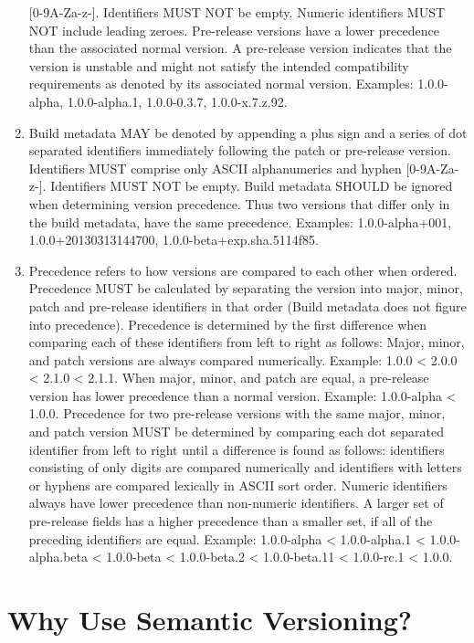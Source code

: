 \documentclass[a4paper,12pt,notitlepage,twoside,openright]{article}
\begin{document}
\begin{enumerate}
  {[}0-9A-Za-z-{]}. Identifiers MUST NOT be empty. Numeric identifiers
  MUST NOT include leading zeroes. Pre-release versions have a lower
  precedence than the associated normal version. A pre-release version
  indicates that the version is unstable and might not satisfy the
  intended compatibility requirements as denoted by its associated
  normal version. Examples: 1.0.0-alpha, 1.0.0-alpha.1, 1.0.0-0.3.7,
  1.0.0-x.7.z.92.
\item
  Build metadata MAY be denoted by appending a plus sign and a series of
  dot separated identifiers immediately following the patch or
  pre-release version. Identifiers MUST comprise only ASCII
  alphanumerics and hyphen {[}0-9A-Za-z-{]}. Identifiers MUST NOT be
  empty. Build metadata SHOULD be ignored when determining version
  precedence. Thus two versions that differ only in the build metadata,
  have the same precedence. Examples: 1.0.0-alpha+001,
  1.0.0+20130313144700, 1.0.0-beta+exp.sha.5114f85.
\item
  Precedence refers to how versions are compared to each other when
  ordered. Precedence MUST be calculated by separating the version into
  major, minor, patch and pre-release identifiers in that order (Build
  metadata does not figure into precedence). Precedence is determined by
  the first difference when comparing each of these identifiers from
  left to right as follows: Major, minor, and patch versions are always
  compared numerically. Example: 1.0.0 \textless{} 2.0.0 \textless{}
  2.1.0 \textless{} 2.1.1. When major, minor, and patch are equal, a
  pre-release version has lower precedence than a normal version.
  Example: 1.0.0-alpha \textless{} 1.0.0. Precedence for two pre-release
  versions with the same major, minor, and patch version MUST be
  determined by comparing each dot separated identifier from left to
  right until a difference is found as follows: identifiers consisting
  of only digits are compared numerically and identifiers with letters
  or hyphens are compared lexically in ASCII sort order. Numeric
  identifiers always have lower precedence than non-numeric identifiers.
  A larger set of pre-release fields has a higher precedence than a
  smaller set, if all of the preceding identifiers are equal. Example:
  1.0.0-alpha \textless{} 1.0.0-alpha.1 \textless{} 1.0.0-alpha.beta
  \textless{} 1.0.0-beta \textless{} 1.0.0-beta.2 \textless{}
  1.0.0-beta.11 \textless{} 1.0.0-rc.1 \textless{} 1.0.0.
\end{enumerate}

\hypertarget{why-use-semantic-versioning}{%
\section{Why Use Semantic
Versioning?}\label{why-use-semantic-versioning}}
\end{document}
